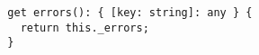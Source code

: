 \begin{verbatim}
  get errors(): { [key: string]: any } {
    return this._errors;
  }
\end{verbatim}
